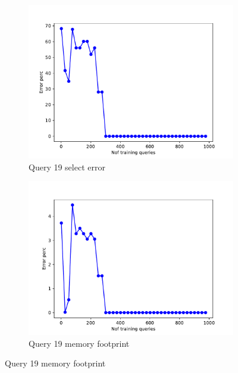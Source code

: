 \begin{figure}[t!]
  \begin{subfigure}[t]{0.5\textwidth}
    \includegraphics[scale=0.4]{figs/airtraffic/airtraffic_sel19_1_error.pdf}
    \caption{Query 19 select error}
    \label{fig:sel19}
  \end{subfigure}
  \begin{subfigure}[t]{0.5\textwidth}
    \includegraphics[scale=0.4]{figs/airtraffic/airtraffic_q19_1_memerror.pdf}
    \caption{Query 19 memory footprint}
    \label{fig:sel19}
   \end{subfigure}

\end{figure}







